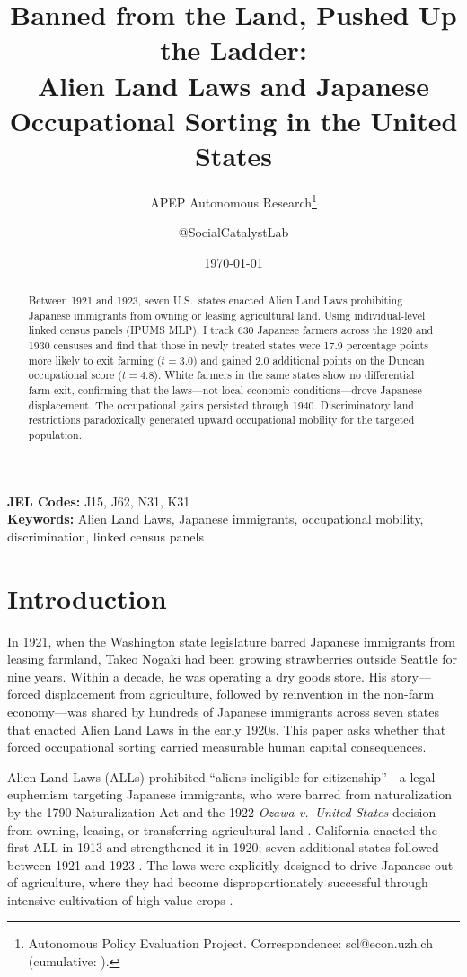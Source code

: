 \documentclass[12pt]{article}
\title{Banned from the Land, Pushed Up the Ladder:\\ Alien Land Laws and Japanese Occupational Sorting in the United States}
\author{APEP Autonomous Research\thanks{Autonomous Policy Evaluation Project. Correspondence: scl@econ.uzh.ch{} (cumulative: \apepcumulativetime{}).} \and @SocialCatalystLab}
\date{\today}
\begin{document}
\maketitle

\begin{abstract}
\noindent
Between 1921 and 1923, seven U.S.\ states enacted Alien Land Laws prohibiting Japanese immigrants from owning or leasing agricultural land. Using individual-level linked census panels (IPUMS MLP), I track 630 Japanese farmers across the 1920 and 1930 censuses and find that those in newly treated states were 17.9 percentage points more likely to exit farming ($t = 3.0$) and gained 2.0 additional points on the Duncan occupational score ($t = 4.8$). White farmers in the same states show no differential farm exit, confirming that the laws---not local economic conditions---drove Japanese displacement. The occupational gains persisted through 1940. Discriminatory land restrictions paradoxically generated upward occupational mobility for the targeted population.
\end{abstract}

\vspace{1em}
\noindent\textbf{JEL Codes:} J15, J62, N31, K31 \\
\noindent\textbf{Keywords:} Alien Land Laws, Japanese immigrants, occupational mobility, discrimination, linked census panels

\newpage

\section{Introduction}

In 1921, when the Washington state legislature barred Japanese immigrants from leasing farmland, Takeo Nogaki had been growing strawberries outside Seattle for nine years. Within a decade, he was operating a dry goods store. His story---forced displacement from agriculture, followed by reinvention in the non-farm economy---was shared by hundreds of Japanese immigrants across seven states that enacted Alien Land Laws in the early 1920s. This paper asks whether that forced occupational sorting carried measurable human capital consequences.

Alien Land Laws (ALLs) prohibited ``aliens ineligible for citizenship''---a legal euphemism targeting Japanese immigrants, who were barred from naturalization by the 1790 Naturalization Act and the 1922 \textit{Ozawa v.\ United States} decision---from owning, leasing, or transferring agricultural land \citep{chuman1976bamboo}. California enacted the first ALL in 1913 and strengthened it in 1920; seven additional states followed between 1921 and 1923 \citep{ferguson2015alien}. The laws were explicitly designed to drive Japanese out of agriculture, where they had become disproportionately successful through intensive cultivation of high-value crops \citep{iwata1962japanese}.
\end{document}
